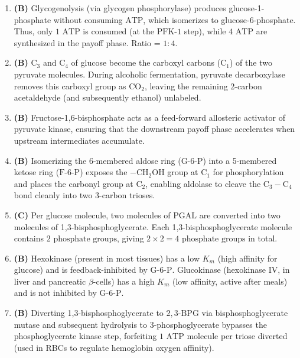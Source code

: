 \documentclass[11pt, a4paper]{article}
\begin{document}
\begin{enumerate}[label=\textbf{\arabic*.}]
\item \textbf{(B)} Glycogenolysis (via glycogen phosphorylase) produces glucose-1-phosphate without consuming $\text{ATP}$, which isomerizes to glucose-6-phosphate. Thus, only $1\text{ ATP}$ is consumed (at the $\text{PFK-1}$ step), while $4\text{ ATP}$ are synthesized in the payoff phase. Ratio = $1 : 4$.

\item \textbf{(B)} $\text{C}_3$ and $\text{C}_4$ of glucose become the carboxyl carbons ($\text{C}_1$) of the two pyruvate molecules. During alcoholic fermentation, pyruvate decarboxylase removes this carboxyl group as $\text{CO}_2$, leaving the remaining 2-carbon acetaldehyde (and subsequently ethanol) unlabeled.

\item \textbf{(B)} Fructose-1,6-bisphosphate acts as a feed-forward allosteric activator of pyruvate kinase, ensuring that the downstream payoff phase accelerates when upstream intermediates accumulate.

\item \textbf{(B)} Isomerizing the 6-membered aldose ring ($\text{G-6-P}$) into a 5-membered ketose ring ($\text{F-6-P}$) exposes the $-\text{CH}_2\text{OH}$ group at $\text{C}_1$ for phosphorylation and places the carbonyl group at $\text{C}_2$, enabling aldolase to cleave the $\text{C}_3-\text{C}_4$ bond cleanly into two 3-carbon trioses.

\item \textbf{(C)} Per glucose molecule, two molecules of $\text{PGAL}$ are converted into two molecules of 1,3-bisphosphoglycerate. Each 1,3-bisphosphoglycerate molecule contains $2\text{ phosphate groups}$, giving $2 \times 2 = 4\text{ phosphate groups}$ in total.

\item \textbf{(B)} Hexokinase (present in most tissues) has a low $K_m$ (high affinity for glucose) and is feedback-inhibited by $\text{G-6-P}$. Glucokinase (hexokinase IV, in liver and pancreatic $\beta$-cells) has a high $K_m$ (low affinity, active after meals) and is not inhibited by $\text{G-6-P}$.

\item \textbf{(B)} Diverting 1,3-bisphosphoglycerate to $2,3\text{-BPG}$ via bisphosphoglycerate mutase and subsequent hydrolysis to 3-phosphoglycerate bypasses the phosphoglycerate kinase step, forfeiting $1\text{ ATP}$ molecule per triose diverted (used in RBCs to regulate hemoglobin oxygen affinity).


\end{enumerate}
\end{document}
